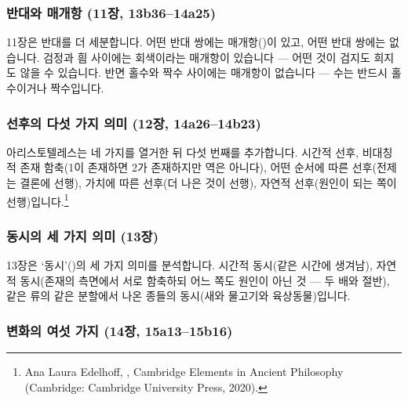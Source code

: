 \documentclass[12pt, a4paper]{article}
\begin{document}
\subsubsection{반대와 매개항 (11장, 13b36--14a25)}

11장은 반대를 더 세분합니다. 어떤 반대 쌍에는 매개항()이 있고, 어떤 반대 쌍에는 없습니다. 검정과 흼 사이에는 회색이라는 매개항이 있습니다 --- 어떤 것이 검지도 희지도 않을 수 있습니다. 반면 홀수와 짝수 사이에는 매개항이 없습니다 --- 수는 반드시 홀수이거나 짝수입니다.

\subsubsection{선후의 다섯 가지 의미 (12장, 14a26--14b23)}


아리스토텔레스는 네 가지를 열거한 뒤 다섯 번째를 추가합니다. 시간적 선후, 비대칭적 존재 함축(1이 존재하면 2가 존재하지만 역은 아니다), 어떤 순서에 따른 선후(전제는 결론에 선행), 가치에 따른 선후(더 나은 것이 선행), 자연적 선후(원인이 되는 쪽이 선행)입니다.\footnote{Ana Laura Edelhoff, , Cambridge Elements in Ancient Philosophy (Cambridge: Cambridge University Press, 2020).}

\subsubsection{동시의 세 가지 의미 (13장)}

13장은 `동시'()의 세 가지 의미를 분석합니다. 시간적 동시(같은 시간에 생겨남), 자연적 동시(존재의 측면에서 서로 함축하되 어느 쪽도 원인이 아닌 것 --- 두 배와 절반), 같은 류의 같은 분할에서 나온 종들의 동시(새와 물고기와 육상동물)입니다.

\subsubsection{변화의 여섯 가지 (14장, 15a13--15b16)}
\end{document}
